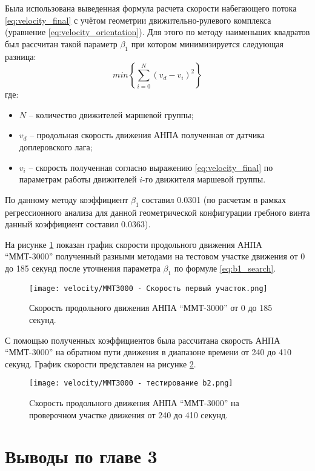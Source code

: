 Была использована выведенная формула расчета скорости набегающего потока \ref{eq:velocity_final} с учётом геометрии движительно-рулевого комплекса (уравнение \ref{eq:velocity_orientation}).
Для этого по методу наименьших квадратов был рассчитан такой параметр $\beta_1$ при котором минимизируется следующая разница:
\begin{equation}
    \label{eq:b1_search}
    min\left\{ \sum_{i=0}^N\left( v_d - v_i \right)^2 \right\}
\end{equation}
\noindent где:
\begin{itemize}
    \item $N$ -- количество движителей маршевой группы;
    \item $v_d$ -- продольная скорость движения АНПА полученная от датчика доплеровского лага;
    \item $v_i$ -- скорость полученная согласно выражению \ref{eq:velocity_final} по параметрам работы движителей $i$-го движителя маршевой группы.
\end{itemize}

По данному методу коэффициент $\beta_1$ составил 0.0301 (по расчетам в рамках регрессионного анализа для данной геометрической конфигурации гребного винта данный коэффициент составил 0.0363).

На рисунке \ref{fig:mmt3000_velocity_test} показан график скорости продольного движения АНПА ``ММТ-3000'' полученный разными методами на тестовом участке движения от 0 до 185 секунд после уточнения параметра $\beta_1$ по формуле \ref{eq:b1_search}.

\begin{figure}[ht]
    \centering
    \texttt{[image: velocity/MMT3000 - Скорость первый участок.png]}
    \caption{Скорость продольного движения АНПА ``ММТ-3000'' от 0 до 185 секунд.}
    \label{fig:mmt3000_velocity_test}
\end{figure}

С помощью полученных коэффициентов была рассчитана скорость АНПА ``ММТ-3000'' на обратном пути движения в диапазоне времени от 240 до 410 секунд.
График скорости представлен на рисунке \ref{fig:mmt3000_velocity_check}.

\begin{figure}[ht]
    \centering
    \texttt{[image: velocity/ММТ3000 - тестирование b2.png]}
    \caption{Cкорость продольного движения АНПА ``ММТ-3000'' на проверочном участке движения от 240 до 410 секунд.}
    \label{fig:mmt3000_velocity_check}
\end{figure}

\section{Выводы по главе 3}
